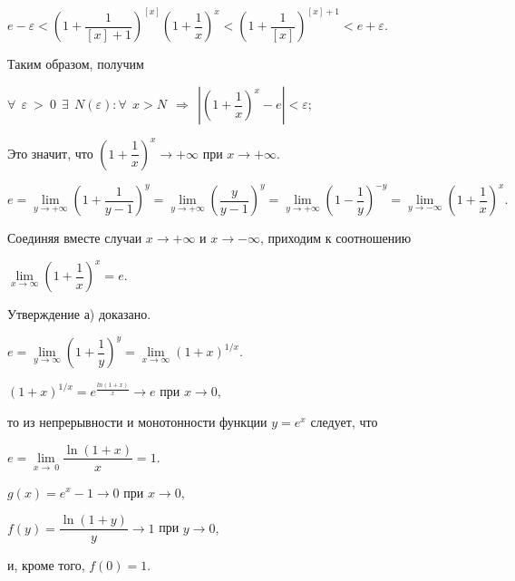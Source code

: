 \documentclass[12pt,titlepage]{report}
\begin{document}
\begin{center}
$
e-\varepsilon <\left(1+\dfrac{1}{[x]+1} \right )^{[x]}\left(1+\dfrac{1}{x} \right )^{x}<\left(1+\dfrac{1}{[x]} \right )^{[x]+1}<e+\varepsilon.
$
\end{center} 
Таким образом, получим
\begin{center}
 $
\forall\: \: \varepsilon\: >\: 0   \:\:  \exists \:\:  N(\varepsilon ):\forall\: \:  x>N \: \: \Rightarrow \: \:  \left | \left(1+\dfrac{1}{x}\right)^{x}-e \right |<\varepsilon ;
   $
\end{center} 
Это значит, что $\left(1+\dfrac{1}{x}\right)^{x} \rightarrow  +\infty $ при $ x \rightarrow  +\infty $. 

\begin{center}
$
e= \lim\limits_{y\to+\infty} \left(1+\dfrac{1}{y-1}\right)^{y} = \lim\limits_{y\to+\infty} \left(\dfrac{y}{y-1}\right)^{y} = \lim\limits_{y\to+\infty} \left(1-\dfrac{1}{y}\right)^{-y}= \lim\limits_{y\to-\infty} \left(1+\dfrac{1}{x}\right)^{x}.
$
\end{center}
Соединяя вместе случаи $x \rightarrow +\infty $ и $x \rightarrow -\infty $, приходим к соотношению 
\begin{center}
$
 \lim\limits_{x\to\infty} \left(1+\dfrac{1}{x}\right)^{x} = e.
$
\end{center}
Утверждение а) доказано.

\begin{center}
$
 e=\lim\limits_{y\to\infty} \left(1+\dfrac{1}{y}\right)^{y} =  \lim\limits_{x\to\infty} \left(1+x\right)^{1/x}.
$
\end{center}

\begin{center}
$(1+x)^{1/x}=e^{\frac{ln(1+x)}{x}}\rightarrow e$ при $x\rightarrow 0,$
\end{center}
то из непрерывности и монотонности функции $y=e^{x}$ следует, что

\begin{center}
$ e=\lim\limits_{x\to\ 0} \dfrac{\ln(1+x)}{x} = 1.$
\end{center}


\begin{center}
$ g(x)=e^{x}-1 \rightarrow 0 $ при $x \rightarrow 0,$

$ f(y)=\dfrac{\ln(1+y)}{y} \rightarrow 1 $ при $y \rightarrow 0,$
\end{center}
и, кроме того, $f(0)=1.$
\end{document}
